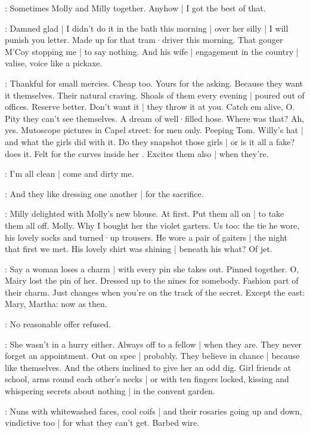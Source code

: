 \BloomHist:
Sometimes Molly and Milly together.
Anyhow |
I got the best of that.

\BloomToday:
Damned glad |
I didn't do it in the bath this morning |
over her silly |
I will punish you letter.
Made up for that tram·driver this morning.
That gouger M'Coy stopping me |
to say nothing.
And his wife |
engagement in the country |
valise,
voice like a pickaxe.

\BloomAbstract:
Thankful for small mercies.
Cheap too.
Yours for the asking.%
Because they want it themselves.
Their natural craving.
Shoals of them every evening |
poured out of offices.
Reserve better.
Don't want it |
they throw it at you.
Catch em alive,
O.
Pity they can't see themselves.
A dream of well·filled hose.
Where was that?
Ah,
yes.
Mutoscope pictures in Capel street:
for men only.
Peeping Tom.
Willy's hat |
and what the girls did with it.
Do they snapshot those girls |
or is it all a fake?
 does it.
Felt for the curves inside her .
Excites them also |
when they're.

\BloomOther:
I'm all clean |
come and dirty me.

\BloomAbstract:
And they like dressing one another |
for the sacrifice.

\BloomHist:
Milly delighted with Molly's new blouse.
At first.
Put them all on |
to take them all off.
Molly.
Why I bought her the violet garters.%
Us too:
the tie he wore,
his lovely socks and turned·up trousers.
He wore a pair of gaiters |
the night that first we met.
His lovely shirt was shining |
beneath his what?
Of jet.

\BloomAbstract:
Say a woman loses a charm |
with every pin she takes out.
Pinned together.
O,
Mairy lost the pin of her.
Dressed up to the nines for somebody.
Fashion part of their charm.
Just changes when you're on the track of the secret.
Except the east:
Mary,
Martha:
now as then.

\BloomOther:
No reasonable offer refused.

\BloomCurrent:
She wasn't in a hurry either.
Always off to a fellow |
when they are.
They never forget an appointment.
Out on spec |
probably.
They believe in chance |
because like themselves.
And the others inclined to give her an odd dig.
Girl friends at school,
arms round each other's necks |%
or with ten fingers locked,
kissing and whispering secrets about nothing |
in the convent garden.

\BloomAbstract:
Nuns with whitewashed faces,
cool coifs |
and their rosaries
going up and down,
vindictive too |
for what they can't get.
Barbed wire.

